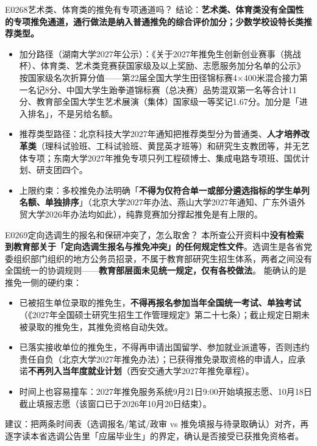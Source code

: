 \begin{qa}{E0268}{艺术类、体育类的推免有专项通道吗？}
结论：\textbf{艺术类、体育类没有全国性的专项推免通道，通行做法是纳入普通推免的综合评价加分；少数学校设特长类推荐类型。}
\begin{itemize}
  \item 加分路径（湖南大学2027年公示）：《关于2027年推免生创新创业赛事（挑战杯）、体育类、艺术类竞赛获国家级及以上奖励、志愿服务加分名单的公示》按国家级名次折算分值——第22届全国大学生田径锦标赛4×400米混合接力第一名记8分、中国大学生跆拳道锦标赛（总决赛）品势混双第一名等合计11分、教育部全国大学生艺术展演（集体）国家级一等奖记1.67分。加分是「进入排名」，不是另给名额。
  \item 推荐类型路径：北京科技大学2027年通知把推荐类型分为普通类、\textbf{人才培养改革类}（理科试验班、工科试验班、黄昆英才班等）和研究生支教团等，并无艺体专项；东南大学2027年推免专项只列工程硕博士、集成电路专项班、国优计划、研支团四个。
  \item 上限约束：多校推免办法明确「\textbf{不得为仅符合单一或部分遴选指标的学生单列名额、单独排序}」（北京大学2027年办法、燕山大学2027年通知、广东外语外贸大学2026年办法均如此），纯靠竞赛加分撑起推免是有上限的。
\end{itemize}
\end{qa}

\begin{qa}{E0269}{定向选调生的报名和保研冲突了，怎么取舍？}
本所查公开资料中\textbf{没有检索到教育部关于「定向选调生报名与推免冲突」的任何规定性文件}。选调生是各省党委组织部门组织的地方公务员招录，不属于教育部研究生招生体系，两者之间没有全国统一的协调规则——\textbf{教育部层面未见统一规定，仅有各校做法}。
能确认的是推免一侧的硬约束：
\begin{itemize}
  \item 已被招生单位录取的推免生，\textbf{不得再报名参加当年全国统一考试、单独考试}（《2027年全国硕士研究生招生工作管理规定》第二十七条）；截止规定日期未被录取的推免生，其推免资格自动失效。
  \item 已落实接收单位的推免生，不得再申请出国留学、参加就业派遣等，否则违约责任自负（北京大学2027年推免办法）；已获得推免录取资格的申请人，应承诺\textbf{不再列入当年度就业计划}（西安交通大学2027年推免章程）。
  \item 时间上也容易撞车：2027年推免服务系统9月21日9:00开始填报志愿、10月18日截止填报志愿（该窗口已于2026年10月20日结束）。
\end{itemize}
建议：把两条时间表（选调报名/笔试/政审 vs 推免填报与待录取确认）对齐，再逐字读本省选调公告里「应届毕业生」的界定，确认是否接受已获推免资格者。
\end{qa}

